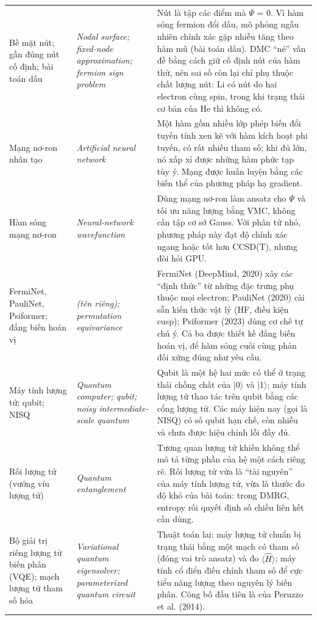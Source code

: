 \begin{longtable}{@{}>{\raggedright\arraybackslash}p{}>{\raggedright\arraybackslash\itshape}p{}>{\raggedright\arraybackslash}p{}@{}}
Bề mặt nút; gần đúng nút cố định; bài toán dấu & Nodal surface; fixed-node approximation; fermion sign problem & Nút là tập các điểm mà $\Psi$ = 0. Vì hàm sóng fermion đổi dấu, mô phỏng ngẫu nhiên chính xác gặp nhiễu tăng theo hàm mũ (bài toán dấu). DMC ``né'' vấn đề bằng cách giữ cố định nút của hàm thử, nên sai số còn lại chỉ phụ thuộc chất lượng nút: Li có nút do hai electron cùng spin, trong khi trạng thái cơ bản của He thì không có. \\[2pt]
Mạng nơ-ron nhân tạo & Artificial neural network & Một hàm gồm nhiều lớp phép biến đổi tuyến tính xen kẽ với hàm kích hoạt phi tuyến, có rất nhiều tham số; khi đủ lớn, nó xấp xỉ được những hàm phức tạp tùy ý. Mạng được huấn luyện bằng các biến thể của phương pháp hạ gradient. \\[2pt]
Hàm sóng mạng nơ-ron & Neural-network wavefunction & Dùng mạng nơ-ron làm ansatz cho $\Psi$ và tối ưu năng lượng bằng VMC, không cần tập cơ sở Gauss. Với phân tử nhỏ, phương pháp này đạt độ chính xác ngang hoặc tốt hơn CCSD(T), nhưng đòi hỏi GPU. \\[2pt]
FermiNet, PauliNet, Psiformer; đẳng biến hoán vị & (tên riêng); permutation equivariance & FermiNet (DeepMind, 2020) xây các ``định thức'' từ những đặc trưng phụ thuộc mọi electron; PauliNet (2020) cài sẵn kiến thức vật lý (HF, điều kiện cusp); Psiformer (2023) dùng cơ chế tự chú ý. Cả ba được thiết kế đẳng biến hoán vị, để hàm sóng cuối cùng phản đối xứng đúng như yêu cầu. \\[2pt]
Máy tính lượng tử; qubit; NISQ & Quantum computer; qubit; noisy intermediate-scale quantum & Qubit là một hệ hai mức có thể ở trạng thái chồng chất của |0$\rangle$ và |1$\rangle$; máy tính lượng tử thao tác trên qubit bằng các cổng lượng tử. Các máy hiện nay (gọi là NISQ) có số qubit hạn chế, còn nhiễu và chưa được hiệu chỉnh lỗi đầy đủ. \\[2pt]
Rối lượng tử (vướng víu lượng tử) & Quantum entanglement & Tương quan lượng tử khiến không thể mô tả từng phần của hệ một cách riêng rẽ. Rối lượng tử vừa là ``tài nguyên'' của máy tính lượng tử, vừa là thước đo độ khó của bài toán: trong DMRG, entropy rối quyết định số chiều liên kết cần dùng. \\[2pt]
Bộ giải trị riêng lượng tử biến phân (VQE); mạch lượng tử tham số hóa & Variational quantum eigensolver; parameterized quantum circuit & Thuật toán lai: máy lượng tử chuẩn bị trạng thái bằng một mạch có tham số (đóng vai trò ansatz) và đo $\langle\hat H\rangle$; máy tính cổ điển điều chỉnh tham số để cực tiểu năng lượng theo nguyên lý biến phân. Công bố đầu tiên là của Peruzzo et al. (2014). \\[2pt]

\end{longtable}
